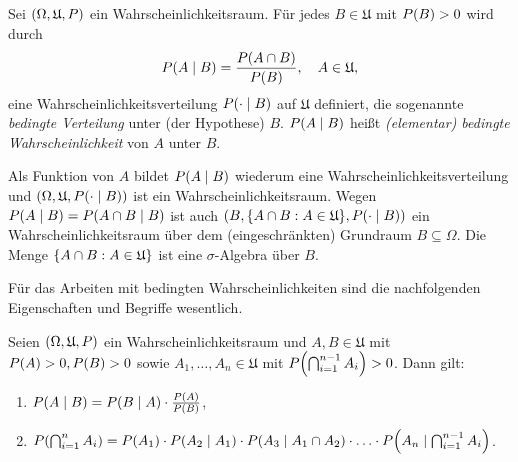 \documentclass{lecture}
\begin{document}
    \begin{definition}
        Sei \(\parentheses*{\Omega, \mathfrak{U}, P}\) ein Wahrscheinlichkeitsraum.
        Für jedes \(B \in \mathfrak{U}\) mit \(P\parentheses*{B} > 0\) wird durch
        \[
            P\parentheses*{A \mid B} = \frac{P\parentheses*{A \cap B}}{P\parentheses*{B}}, \quad A \in \mathfrak{U},
        \]
        eine Wahrscheinlichkeitsverteilung \(P\parentheses*{\cdot \mid B}\) auf \(\mathfrak{U}\) definiert, die sogenannte \emph{bedingte Verteilung} unter (der Hypothese) \(B\).
        \(P\parentheses*{A \mid B}\) heißt \emph{(elementar) bedingte Wahrscheinlichkeit} von \(A\) unter \(B\). 
    \end{definition}

    Als Funktion von \(A\) bildet \(P\parentheses*{A \mid B}\) wiederum eine Wahrscheinlichkeitsverteilung und \(\parentheses*{\Omega, \mathfrak{U}, P\parentheses*{\cdot \mid B}}\) ist ein Wahrscheinlichkeitsraum.
    Wegen \(P\parentheses*{A \mid B} = P\parentheses*{A \cap B \mid B}\) ist auch \(\parentheses*{B, \braces*{A \cap B : A \in \mathfrak{U}}, P\parentheses*{\cdot \mid B}}\) ein Wahrscheinlichkeitsraum über dem (eingeschränkten) Grundraum \(B \subseteq \Omega\).
    Die Menge \(\braces*{A \cap B : A \in \mathfrak{U}}\) ist eine \(\sigma\)-Algebra über \(B\).

    Für das Arbeiten mit bedingten Wahrscheinlichkeiten sind die nachfolgenden Eigenschaften und Begriffe wesentlich.

    \begin{lemma}
        Seien \(\parentheses*{\Omega, \mathfrak{U}, P}\) ein Wahrscheinlichkeitsraum und \(A, B \in \mathfrak{U}\) mit \(P\parentheses*{A} > 0, P\parentheses*{B} > 0\) sowie \(A_1, \ldots, A_n \in \mathfrak{U}\) mit \(P\parentheses*{\bigcap_{i = 1}^{n - 1}A_i} > 0\).
        Dann gilt:
        \begin{enumerate}
            \item \(P\parentheses*{A \mid B} = P\parentheses*{B \mid A} \cdot \frac{P\parentheses*{A}}{P\parentheses*{B}}\),
            \item \(P\parentheses*{\bigcap_{i = 1}^n A_i} = P\parentheses*{A_1} \cdot P\parentheses*{A_2 \mid A_1} \cdot P\parentheses*{A_3 \mid A_1 \cap A_2} \cdot \ldots \cdot P\parentheses*{A_n \mid \bigcap_{i = 1}^{n - 1}A_i}\).
        \end{enumerate}
    \end{lemma}
\end{document}
